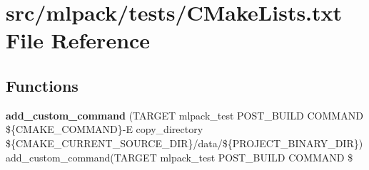 \section{src/mlpack/tests/\+C\+Make\+Lists.txt File Reference}
\label{tests_2CMakeLists_8txt}
\subsection*{Functions}
\begin{DoxyCompactItemize}
\item 
{\bf add\+\_\+custom\+\_\+command} (T\+A\+R\+G\+ET mlpack\+\_\+test P\+O\+S\+T\+\_\+\+B\+U\+I\+LD C\+O\+M\+M\+A\+ND \$\{C\+M\+A\+K\+E\+\_\+\+C\+O\+M\+M\+A\+ND\}-\/E copy\+\_\+directory \$\{C\+M\+A\+K\+E\+\_\+\+C\+U\+R\+R\+E\+N\+T\+\_\+\+S\+O\+U\+R\+C\+E\+\_\+\+D\+IR\}/data/\$\{P\+R\+O\+J\+E\+C\+T\+\_\+\+B\+I\+N\+A\+R\+Y\+\_\+\+D\+IR\}) add\+\_\+custom\+\_\+command(T\+A\+R\+G\+ET mlpack\+\_\+test P\+O\+S\+T\+\_\+\+B\+U\+I\+LD C\+O\+M\+M\+A\+ND \$
\item 

\end{DoxyCompactItemize}
